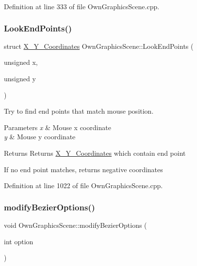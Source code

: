 Definition at line 333 of file Own\+Graphics\+Scene.\+cpp.

\mbox{\label{classOwnGraphicsScene_a17930b28f2c5cb7ed14440e44d667951}} 
\subsubsection{\texorpdfstring{Look\+End\+Points()}{LookEndPoints()}}
{\footnotesize\ttfamily struct \mbox{\hyperlink{structX__Y__Coordinates}{X\+\_\+\+Y\+\_\+\+Coordinates}} Own\+Graphics\+Scene\+::\+Look\+End\+Points (\begin{DoxyParamCaption}\item[{unsigned}]{x,  }\item[{unsigned}]{y }\end{DoxyParamCaption})}



Try to find end points that match mouse position. 


\begin{DoxyParams}{Parameters}
{\em x} & Mouse x coordinate \\
\hline
{\em y} & Mouse y coordinate \\
\hline
\end{DoxyParams}
\begin{DoxyReturn}{Returns}
Returns \mbox{\hyperlink{structX__Y__Coordinates}{X\+\_\+\+Y\+\_\+\+Coordinates}} which contain end point
\end{DoxyReturn}
If no end point matches, returns negative coordinates 

Definition at line 1022 of file Own\+Graphics\+Scene.\+cpp.

\mbox{\label{classOwnGraphicsScene_a302a5f437c44f6fc84f9911e41172734}} 
\subsubsection{\texorpdfstring{modify\+Bezier\+Options()}{modifyBezierOptions()}}
{\footnotesize\ttfamily void Own\+Graphics\+Scene\+::modify\+Bezier\+Options (\begin{DoxyParamCaption}\item[{int}]{option }\end{DoxyParamCaption})}




